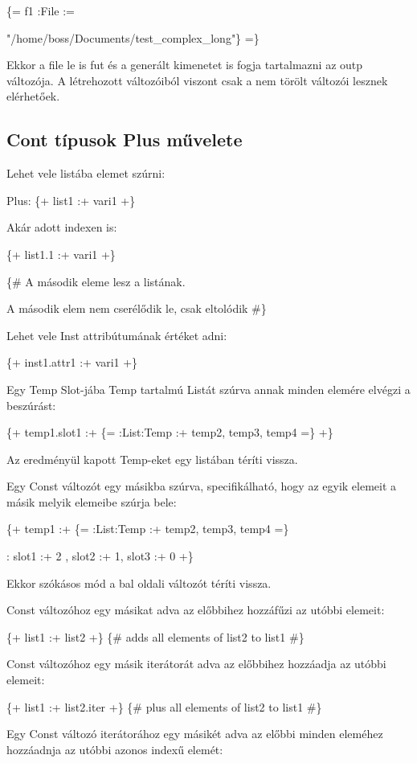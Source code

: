 \{= f1 :File := {"/home/boss/Documents/test\_complex\_long"\} =\}

Ekkor a file le is fut és a generált kimenetet is fogja tartalmazni az outp változója.
A létrehozott változóiból viszont csak a nem törölt változói lesznek elérhetőek.



\subsection{Cont típusok Plus művelete}
Lehet vele listába elemet szúrni:

Plus: \{+ list1 :+ vari1 +\}

Akár adott indexen is:

\{+ list1.1 :+ vari1 +\} 

\{\# A második eleme lesz a listának. 

A második elem nem cserélődik le, csak eltolódik \#\}

Lehet vele Inst attribútumának értéket adni:

\{+ inst1.attr1 :+ vari1 +\} 

Egy Temp Slot-jába Temp tartalmú Listát szúrva annak minden elemére elvégzi a beszúrást:

\{+ temp1.slot1 :+ \{= :List:Temp :+ temp2, temp3, temp4 =\} +\} 

Az eredményül kapott Temp-eket egy listában téríti vissza.
 
Egy Const változót egy másikba szúrva, specifikálható, hogy az egyik elemeit a másik melyik elemeibe szúrja bele:

\{+ temp1 :+ \{= :List:Temp :+ temp2, temp3, temp4 =\}

 : slot1 :+ 2 , slot2 :+ 1, slot3 :+ 0   +\} 

Ekkor szókásos mód a bal oldali változót téríti vissza. 

Const változóhoz egy másikat adva az előbbihez hozzáfűzi az utóbbi elemeit:

\{+ list1 :+ list2 +\} \{\# adds all elements of list2 to list1 \#\}

Const változóhoz egy másik iterátorát adva az előbbihez hozzáadja az utóbbi elemeit:

\{+ list1 :+ list2.iter +\} \{\# plus all elements of list2 to list1 \#\}

Egy Const változó iterátorához egy másikét adva az előbbi minden eleméhez hozzáadnja az utóbbi azonos indexű elemét:

}
